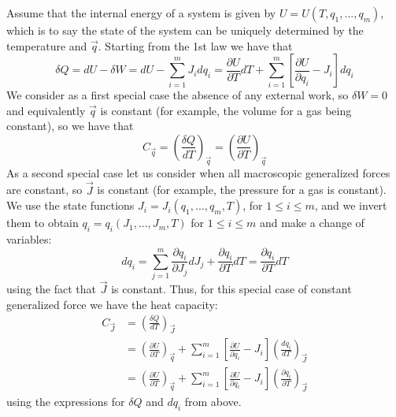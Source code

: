 \documentclass[12pt, a4paper, oneside, openright, titlepage]{book}
\begin{document}
Assume that the internal energy of a system is given by $U = U(T,q_1,...,q_m)$, which is to say the state of the system can be uniquely determined by the temperature and $\vec{q}$. Starting from the 1st law we have that \begin{equation*}
    \delta Q = dU - \delta W = dU - \sum_{i=1}^mJ_idq_i = \frac{\partial U}{\partial T}dT + \sum_{i=1}^m\left[\frac{\partial U}{\partial q_i} - J_i\right]dq_i
\end{equation*}
We consider as a first special case the absence of any external work, so $\delta W = 0$ and equivalently $\vec{q}$ is constant (for example, the volume for a gas being constant), so we have that \begin{equation*}
    C_{\vec{q}} = \left(\frac{\delta Q}{dT}\right)_{\vec{q}} = \left(\frac{\partial U}{\partial T}\right)_{\vec{q}}
\end{equation*}
As a second special case let us consider when all macroscopic generalized forces are constant, so $\vec{J}$ is constant (for example, the pressure for a gas is constant). We use the state functions $J_i=J_i(q_1,...,q_m,T)$, for $1 \leq i \leq m$, and we invert them to obtain $q_i = q_i(J_1,...,J_m,T)$ for $1 \leq i \leq m$ and make a change of variables: \begin{equation*}
    dq_i = \sum_{j=1}^m\frac{\partial q_i}{\partial J_j}dJ_j + \frac{\partial q_i}{\partial T}dT = \frac{\partial q_i}{\partial T}dT
\end{equation*}
using the fact that $\vec{J}$ is constant. Thus, for this special case of constant generalized force we have the heat capacity: \begin{align*}
    C_{\vec{J}} &= \left(\frac{\delta Q}{dT}\right)_{\vec{J}} \\
    &= \left(\frac{\partial U}{\partial T}\right)_{\vec{q}} + \sum_{i=1}^m\left[\frac{\partial U}{\partial q_i} - J_i\right]\left(\frac{dq_i}{dT}\right)_{\vec{J}} \\
    &= \left(\frac{\partial U}{\partial T}\right)_{\vec{q}} + \sum_{i=1}^m\left[\frac{\partial U}{\partial q_i} - J_i\right]\left(\frac{\partial q_i}{\partial T}\right)_{\vec{J}} 
\end{align*}
using the expressions for $\delta Q$ and $dq_i$ from above.
\end{document}

